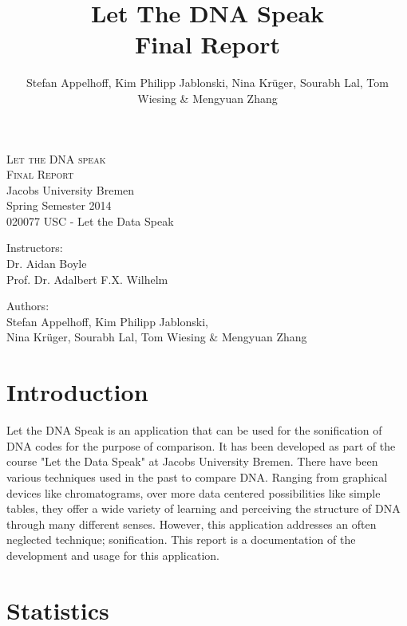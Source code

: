 \documentclass[10pt]{article}
\title{Let The DNA Speak\\Final Report}
\author{Stefan Appelhoff, Kim Philipp Jablonski, Nina Krüger, Sourabh Lal, Tom Wiesing \& Mengyuan Zhang}
\begin{document}
\begin{titlepage}
\thispagestyle{empty}
\begin{center}

\textsc{\huge Let the DNA speak}\\[2cm]
\textsc{\Huge Final Report}\\[6cm]

\Large{Jacobs University Bremen\\
Spring Semester 2014\\020077 USC - Let the Data Speak}
\vspace*{1.2cm}

\Large{Instructors:\\Dr. Aidan Boyle\\Prof. Dr. Adalbert F.X. Wilhelm}
\vspace*{1.2cm}

\Large{Authors:\\Stefan Appelhoff, Kim Philipp Jablonski, \\Nina Krüger, Sourabh Lal, Tom Wiesing \& Mengyuan Zhang}
\vspace*{1.2cm}

\end{center}

\end{titlepage}


\clearpage
\thispagestyle{empty}
\tableofcontents
\newpage

\setcounter{page}{1}
\section{Introduction}
Let the DNA Speak is an application that can be used for the sonification of DNA 
codes for the purpose of comparison. It has been developed as part of the course "Let the Data 
Speak" at Jacobs University Bremen. There have been various techniques used in the past to 
compare DNA. Ranging from graphical devices like chromatograms, over more data centered 
possibilities like simple tables, they offer a wide variety of learning and perceiving the 
structure of DNA through many different senses. However, this application addresses an often 
neglected technique; sonification. This report is a documentation of the development and 
usage for this application.

\section{Statistics}
\end{document}

